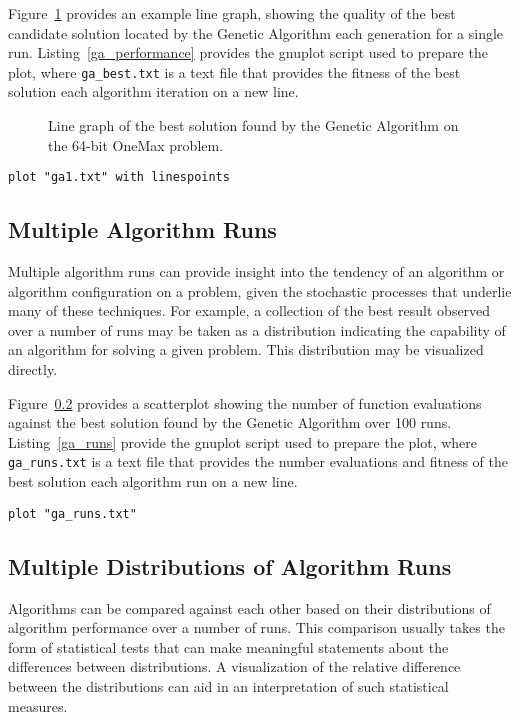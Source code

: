 \documentclass[a4paper, 11pt]{article}
\begin{document}
Figure~\ref{plot:ga1} provides an example line graph, showing the quality of the best candidate solution located by the Genetic Algorithm each generation for a single run. Listing~\ref{ga_performance} provides the gnuplot script used to prepare the plot, where \texttt{ga\_best.txt} is a text file that provides the fitness of the best solution each algorithm iteration on a new line.

\begin{figure}[htp]

\caption{Line graph of the best solution found by the Genetic Algorithm on the 64-bit OneMax problem.}
\label{plot:ga1}
\end{figure}

\begin{lstlisting}[caption=Plot of the best candidate solution found by the Genetic Algorithm each iteration, label=ga_performance]
plot "ga1.txt" with linespoints
\end{lstlisting}

\subsection{Multiple Algorithm Runs}
Multiple algorithm runs can provide insight into the tendency of an algorithm or algorithm configuration on a problem, given the stochastic processes that underlie many of these techniques. For example, a collection of the best result observed over a number of runs may be taken as a distribution indicating the capability of an algorithm for solving a given problem. This distribution may be visualized directly. 

Figure~\ref{} provides a scatterplot showing the number of function evaluations against the best solution found by the Genetic Algorithm over 100 runs. Listing~\ref{ga_runs} provide the gnuplot script used to prepare the plot, where \texttt{ga\_runs.txt} is a text file that provides the number evaluations and fitness of the best solution each algorithm run on a new line. 


\begin{lstlisting}[caption=Scatterplot of objective function evaluations against quality of best solution found over 100 runs of a Genetic Algorithm, label=ga_runs]
plot "ga_runs.txt"
\end{lstlisting}

\subsection{Multiple Distributions of Algorithm Runs}
Algorithms can be compared against each other based on their distributions of algorithm performance over a number of runs. This comparison usually takes the form of statistical tests that can make meaningful statements about the differences between distributions. A visualization of the relative difference between the distributions can aid in an interpretation of such statistical measures. 
\end{document}
